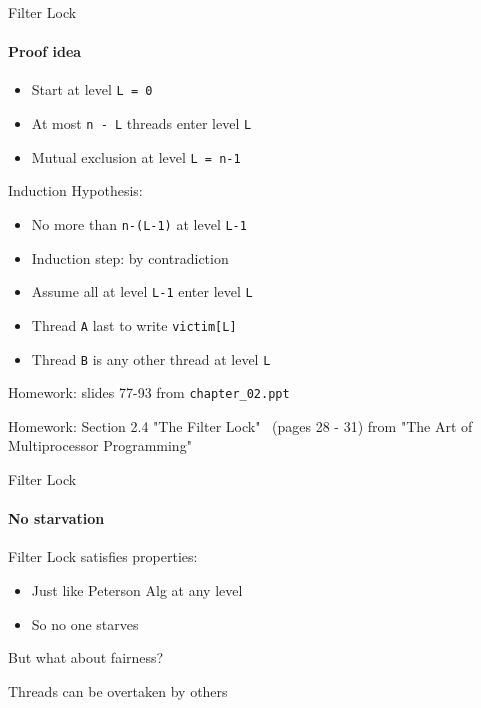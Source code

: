 \begin{frame}[fragile]{Filter Lock}
\framesubtitle{Proof idea}

\begin{itemize}
  \item Start at level \texttt{L = 0}
  \item At most \texttt{n - L} threads enter level \texttt{L}
  \item Mutual exclusion at level \texttt{L = n-1}
\end{itemize}

\pause

Induction Hypothesis:
\begin{itemize}
  \item No more than \texttt{n-(L-1)} at level \texttt{L-1} 
  \item Induction step: by contradiction 
  \item Assume all at level \texttt{L-1} enter level \texttt{L}
  \item Thread \texttt{A} last to write \texttt{victim[L]} 
  \item Thread \texttt{B} is any other thread at level \texttt{L}
\end{itemize}

\pause

Homework: slides 77-93 from \texttt{chapter\_02.ppt}

Homework: Section 2.4 "The Filter Lock" \ (pages 28 - 31) from "The Art of Multiprocessor Programming"

\end{frame}

\begin{frame}[fragile]{Filter Lock}
\framesubtitle{No starvation}

Filter Lock satisfies properties:
\begin{itemize}
  \item Just like Peterson Alg at any level
  \item So no one starves 
\end{itemize}

\pause
But what about fairness?

\pause
Threads can be overtaken by others 

\end{frame}


